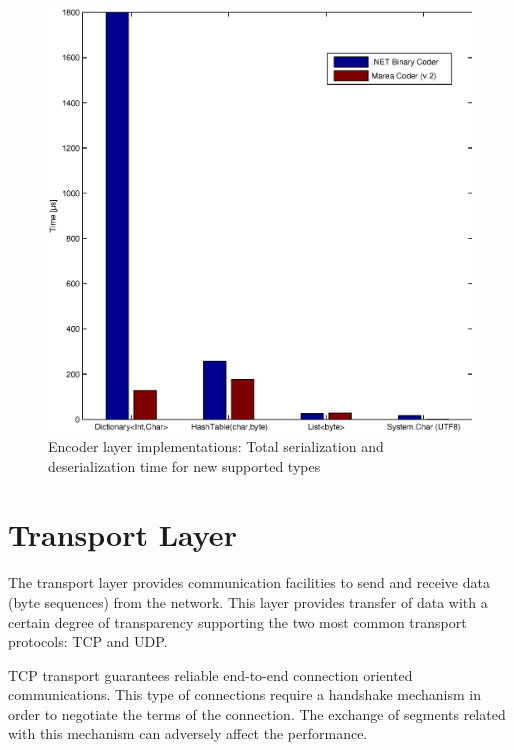 \begin{figure}[H]\begin{center}
 \centering
  \captionsetup{justification=centering}
  \includegraphics[scale=0.6]{pictures/network/LatencyCoderNewTypes}
  \caption{Encoder layer implementations: Total serialization and deserialization time for new supported types \label{fig:coder-latencies-new-types}}
\end{center}\end{figure}

\section{Transport Layer}\label{S:Transports}

The transport layer provides communication facilities to send and receive data (byte sequences) from the network. This layer provides transfer of data with a certain degree of transparency supporting the two most common transport protocols: TCP and UDP.

TCP transport guarantees reliable end-to-end connection oriented communications. This type of connections require a handshake mechanism in order to negotiate the terms of the connection. The exchange of segments related with this mechanism can adversely affect the performance. 

